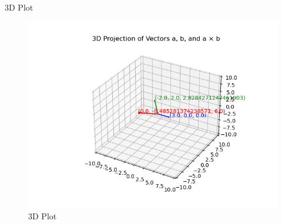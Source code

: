 \documentclass{beamer}
\begin{document}
\begin{frame}{3D Plot}
\begin{figure}[H]
    \centering
    \includegraphics[width=0.8\columnwidth]{figs/fig1.png}
    \caption{3D Plot}
    \label{3D Plot}
\end{figure}
\end{frame}
\end{document}
